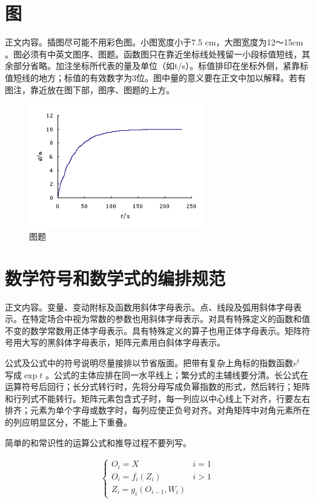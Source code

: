 \section{图}
正文内容。插图尽可能不用彩色图。小图宽度小于7.5 cm，大图宽度为12～15cm 。图必须有中英文图序、图题。函数图只在靠近坐标线处残留一小段标值短线，其余部分省略。加注坐标所代表的量及单位（如t/s）。标值排印在坐标外侧，紧靠标值短线的地方；标值的有效数字为3位。图中量的意义要在正文中加以解释。若有图注，靠近放在图下部，图序、图题的上方。

\begin{figure}[H]
	\centering
	\includegraphics[width=3in]{sections/figs/template.png}
	\caption{\label{fig1111} \xiaowuhao \hei 图题}
\end{figure}

\section{数学符号和数学式的编排规范}
正文内容。变量、变动附标及函数用斜体字母表示。点、线段及弧用斜体字母表示。在特定场合中视为常数的参数也用斜体字母表示。对具有特殊定义的函数和值不变的数学常数用正体字母表示。具有特殊定义的算子也用正体字母表示。矩阵符号用大写的黑斜体字母表示，矩阵元素用白斜体字母表示。

公式及公式中的符号说明尽量接排以节省版面。把带有复杂上角标的指数函数$e^t$ 写成$\exp{t}$ 。公式的主体应排在同一水平线上；繁分式的主辅线要分清。长公式在运算符号后回行；长分式转行时，先将分母写成负幂指数的形式，然后转行；矩阵和行列式不能转行。矩阵元素包含式子时，每一列应以中心线上下对齐，行要左右排齐；元素为单个字母或数字时，每列应使正负号对齐。对角矩阵中对角元素所在的列应明显区分，不能上下重叠。

简单的和常识性的运算公式和推导过程不要列写。

\begin{equation}
	\label{equ333}
	\begin{split}
		\left \{
		\begin{array}{ll}
			O_i = X &i=1 \\
			O_i = f_i(Z_i) & i>1 \\
			Z_i = g_i(O_{i-1}, W_i)
		\end{array}
		\right.
	\end{split}
\end{equation}

